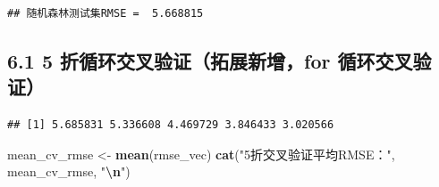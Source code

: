 \documentclass[
]{article}
\newenvironment{Shaded}{\begin{snugshade}}{\end{snugshade}}
\newcommand{\AttributeTok}[1]{\textcolor[rgb]{0.13,0.29,0.53}{#1}}
\newcommand{\ControlFlowTok}[1]{\textcolor[rgb]{0.13,0.29,0.53}{\textbf{#1}}}
\newcommand{\DecValTok}[1]{\textcolor[rgb]{0.00,0.00,0.81}{#1}}
\newcommand{\FloatTok}[1]{\textcolor[rgb]{0.00,0.00,0.81}{#1}}
\newcommand{\FunctionTok}[1]{\textcolor[rgb]{0.13,0.29,0.53}{\textbf{#1}}}
\newcommand{\NormalTok}[1]{#1}
\newcommand{\OtherTok}[1]{\textcolor[rgb]{0.56,0.35,0.01}{#1}}
\newcommand{\SpecialCharTok}[1]{\textcolor[rgb]{0.81,0.36,0.00}{\textbf{#1}}}
\newcommand{\StringTok}[1]{\textcolor[rgb]{0.31,0.60,0.02}{#1}}
\begin{document}
\begin{verbatim}
## 随机森林测试集RMSE =  5.668815
\end{verbatim}

\subsection{6.1 5 折循环交叉验证（拓展新增，for
循环交叉验证）}\label{ux6298ux5faaux73afux4ea4ux53c9ux9a8cux8bc1ux62d3ux5c55ux65b0ux589efor-ux5faaux73afux4ea4ux53c9ux9a8cux8bc1}

\begin{Shaded}
\end{Shaded}

\begin{verbatim}
## [1] 5.685831 5.336608 4.469729 3.846433 3.020566
\end{verbatim}

\begin{Shaded}
\begin{Highlighting}[]
\NormalTok{mean\_cv\_rmse }\OtherTok{\textless{}{-}} \FunctionTok{mean}\NormalTok{(rmse\_vec)}
\FunctionTok{cat}\NormalTok{(}\StringTok{"5折交叉验证平均RMSE："}\NormalTok{, mean\_cv\_rmse, }\StringTok{"}\SpecialCharTok{\textbackslash{}n}\StringTok{"}\NormalTok{)}
\end{Highlighting}
\end{Shaded}
\end{document}
